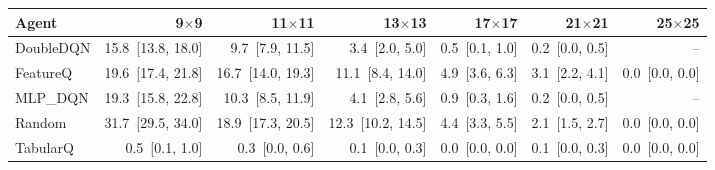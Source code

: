\begin{tabular}{lrrrrrr}
\toprule
Agent & 9$\times$9 & 11$\times$11 & 13$\times$13 & 17$\times$17 & 21$\times$21 & 25$\times$25 \\
\midrule
DoubleDQN & 15.8~[13.8, 18.0] & 9.7~[7.9, 11.5] & 3.4~[2.0, 5.0] & 0.5~[0.1, 1.0] & 0.2~[0.0, 0.5] & -- \\
FeatureQ & 19.6~[17.4, 21.8] & 16.7~[14.0, 19.3] & 11.1~[8.4, 14.0] & 4.9~[3.6, 6.3] & 3.1~[2.2, 4.1] & 0.0~[0.0, 0.0] \\
MLP_DQN & 19.3~[15.8, 22.8] & 10.3~[8.5, 11.9] & 4.1~[2.8, 5.6] & 0.9~[0.3, 1.6] & 0.2~[0.0, 0.5] & -- \\
Random & 31.7~[29.5, 34.0] & 18.9~[17.3, 20.5] & 12.3~[10.2, 14.5] & 4.4~[3.3, 5.5] & 2.1~[1.5, 2.7] & 0.0~[0.0, 0.0] \\
TabularQ & 0.5~[0.1, 1.0] & 0.3~[0.0, 0.6] & 0.1~[0.0, 0.3] & 0.0~[0.0, 0.0] & 0.1~[0.0, 0.3] & 0.0~[0.0, 0.0] \\
\bottomrule
\end{tabular}